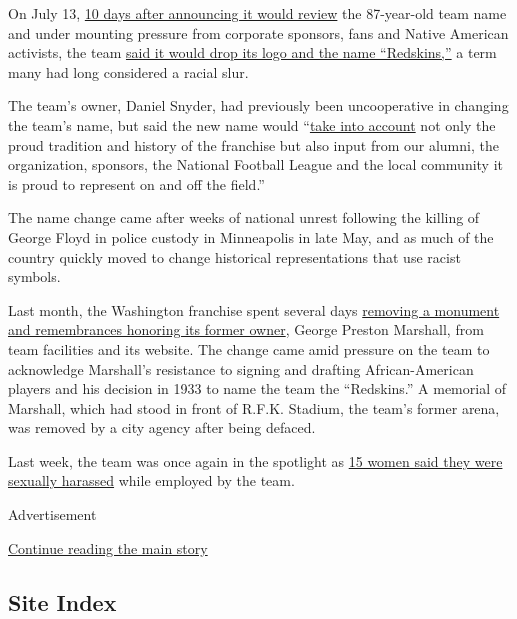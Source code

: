 On July 13,
\href{https://www.nytimes.com/2020/07/03/sports/football/washington-redskins-nickname-history.html}{10
days after announcing it would review} the 87-year-old team name and
under mounting pressure from corporate sponsors, fans and Native
American activists, the team
\href{https://www.nytimes.com/2020/07/13/sports/football/washington-redskins-new-name.html?action=click\&module=Top\%20Stories\&pgtype=Homepage}{said
it would drop its logo and the name ``Redskins,''} a term many had long
considered a racial slur.

The team's owner, Daniel Snyder, had previously been uncooperative in
changing the team's name, but said the new name would
``\href{https://www.nfl.com/news/washington-redskins-to-undergo-thorough-review-of-team-s-name}{take
into account} not only the proud tradition and history of the franchise
but also input from our alumni, the organization, sponsors, the National
Football League and the local community it is proud to represent on and
off the field.''

The name change came after weeks of national unrest following the
killing of George Floyd in police custody in Minneapolis in late May,
and as much of the country quickly moved to change historical
representations that use racist symbols.

Last month, the Washington franchise spent several days
\href{https://www.nytimes.com/2020/06/24/sports/football/redskins-ring-of-fame-marshall.html}{removing
a monument and remembrances honoring its former owner}, George Preston
Marshall, from team facilities and its website. The change came amid
pressure on the team to acknowledge Marshall's resistance to signing and
drafting African-American players and his decision in 1933 to name the
team the ``Redskins.'' A memorial of Marshall, which had stood in front
of R.F.K. Stadium, the team's former arena, was removed by a city agency
after being defaced.

Last week, the team was once again in the spotlight as
\href{https://www.nytimes.com/2020/07/16/sports/football/washington-sexual-assault-harassment-dan-snyder.html}{15
women said they were sexually harassed} while employed by the team.

Advertisement

\protect\hyperlink{after-bottom}{Continue reading the main story}

\hypertarget{site-index}{%
\subsection{Site Index}\label{site-index}}

